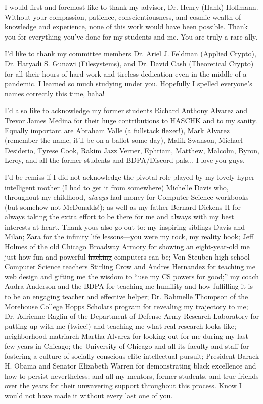 \acknowledgments
I would first and foremost like to thank my advisor, Dr. Henry (Hank) Hoffmann.
Without your compassion, patience, conscientiousness, and cosmic wealth of
knowledge and experience, none of this work would have been possible. Thank you
for everything you've done for my students and me. You are truly a rare ally.

I'd like to thank my committee members Dr. Ariel J. Feldman (Applied Crypto),
Dr. Haryadi S. Gunawi (Filesystems), and Dr. David Cash (Theoretical Crypto) for
all their hours of hard work and tireless dedication even in the middle of a
pandemic. I learned so much studying under you. Hopefully I spelled everyone's
names correctly this time, haha!

I'd also like to acknowledge my former students Richard Anthony Alvarez and
Trevor James Medina for their huge contributions to HASCHK and to my sanity.
Equally important are Abraham Valle (a fullstack flexer!), Mark Alvarez
(remember the name, it'll be on a ballot some day), Malik Swanson, Michael
Desiderio, Tyrese Cook, Rakim Jazz Verner, Ephriam, Matthew, Malcolm, Byron,
Leroy, and all the former students and BDPA/Discord pals... I love you guys.

I'd be remiss if I did not acknowledge the pivotal role played by my lovely
hyper-intelligent mother (I had to get it from somewhere) Michelle Davis who,
throughout my childhood, \emph{always} had money for Computer Science workbooks
(but somehow not McDonalds!); as well as my father Bernard Dickens II for always
taking the extra effort to be there for me and always with my best interests at
heart. Thank yous also go out to: my inspiring siblings Davis and Milan; Zara
for the infinity life lessons---you were my rock, my reality hook; Jeff Holmes
of the old Chicago Broadway Armory for showing an eight-year-old me just how fun
and powerful \sout{hacking} computers can be; Von Steuben high school Computer
Science teachers Stirling Crow and Andres Hernandez for teaching me web design
and gifting me the wisdom to ``use my CS powers for good;'' my coach Audra
Anderson and the BDPA for teaching me humility and how fulfilling it is to be an
engaging teacher and effective helper; Dr. Rahmelle Thompson of the Morehouse
College Hopps Scholars program for revealing my trajectory to me; Dr. Adrienne
Raglin of the Department of Defense Army Research Laboratory for putting up with
me (twice!) and teaching me what real research looks like; neighborhood
matriarch Martha Alvarez for looking out for me during my last few years in
Chicago; the University of Chicago and all its faculty and staff for fostering a
culture of socially conscious elite intellectual pursuit; President Barack H.
Obama and Senator Elizabeth Warren for demonstrating black excellence and how to
persist nevertheless; and all my mentors, former students, and true friends over
the years for their unwavering support throughout this process. Know I would not
have made it without every last one of you.

